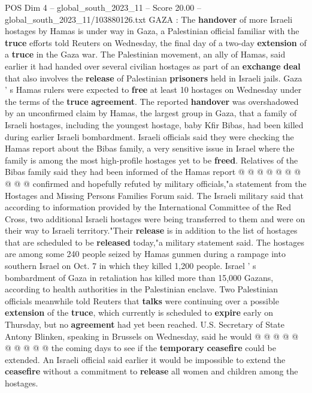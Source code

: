 \begin{textsample}{POS Dim 4 – global\_south\_2023\_11 – Score 20.00 – global\_south\_2023\_11/103880126.txt}  \label{ex:f4_pos_156}
GAZA : The \textbf{handover} of more Israeli hostages by Hamas is under way in Gaza, a Palestinian official familiar with the \textbf{truce} efforts told Reuters on Wednesday, the final day of a two-day \textbf{extension} of a \textbf{truce} in the Gaza war.
The Palestinian movement, an ally of Hamas, said earlier it had handed over several civilian hostages as part of an \textbf{exchange} \textbf{deal} that also involves the \textbf{release} of Palestinian \textbf{prisoners} held in Israeli jails.
Gaza ' s Hamas rulers were expected to \textbf{free} at least 10 hostages on Wednesday under the terms of the \textbf{truce} \textbf{agreement}.
The reported \textbf{handover} was overshadowed by an unconfirmed claim by Hamas, the largest group in Gaza, that a family of Israeli hostages, including the youngest hostage, baby Kfir Bibas, had been killed during earlier Israeli bombardment.
Israeli officials said they were checking the Hamas report about the Bibas family, a very sensitive issue in Israel where the family is among the most high-profile hostages yet to be \textbf{freed}.
Relatives of the Bibas family said they had been informed of the Hamas report @ @ @ @ @ @ @ @ @ @ confirmed and hopefully refuted by military officials,"a statement from the Hostages and Missing Persons Families Forum said.
The Israeli military said that according to information provided by the International Committee of the Red Cross, two additional Israeli hostages were being transferred to them and were on their way to Israeli territory."Their \textbf{release} is in addition to the list of hostages that are scheduled to be \textbf{released} today,"a military statement said.
The hostages are among some 240 people seized by Hamas gunmen during a rampage into southern Israel on Oct. 7 in which they killed 1,200 people.
Israel ' s bombardment of Gaza in retaliation has killed more than 15,000 Gazans, according to health authorities in the Palestinian enclave.
Two Palestinian officials meanwhile told Reuters that \textbf{talks} were continuing over a possible \textbf{extension} of the \textbf{truce}, which currently is scheduled to \textbf{expire} early on Thursday, but no \textbf{agreement} had yet been reached.
U.S.
Secretary of State Antony Blinken, speaking in Brussels on Wednesday, said he would @ @ @ @ @ @ @ @ @ @ the coming days to see if the \textbf{temporary} \textbf{ceasefire} could be extended.
An Israeli official said earlier it would be impossible to extend the \textbf{ceasefire} without a commitment to \textbf{release} all women and children among the hostages.

\end{textsample}
